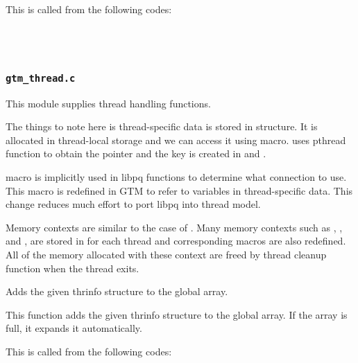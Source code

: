     This is called from the following codes:
    
    \FuncRefHdr
		\\
		\\ \hline
    \FuncRefTrailor




\subsubsection{\texttt{gtm\_thread.c}}

  This module supplies thread handling functions.
  
  The things to note here is thread-specific data is stored in 
  structure.
  It is allocated in thread-local storage and we can access it using  macro.
   uses pthread function to obtain the pointer and the key
   is created in  and .
  
   macro is implicitly used in libpq functions to determine what connection to use.
  This macro is redefined in GTM to refer to variables in thread-specific data.
  This change reduces much effort to port libpq into thread model.
  
  Memory contexts are similar to the case of .
  Many memory contexts such as , ,  and
  , are stored in  for each thread and
  corresponding macros are also redefined.
  All of the memory allocated with these context are freed by thread cleanup function when the thread exits.
  
  
    Adds the given thrinfo structure to the global array.
    
    This function adds the given thrinfo structure to the global array.
    If the array is full, it expands it automatically.
    
    This is called from the following codes:
    
    \FuncRefHdr
		\\
		\\ \hline
    \FuncRefTrailor
  
